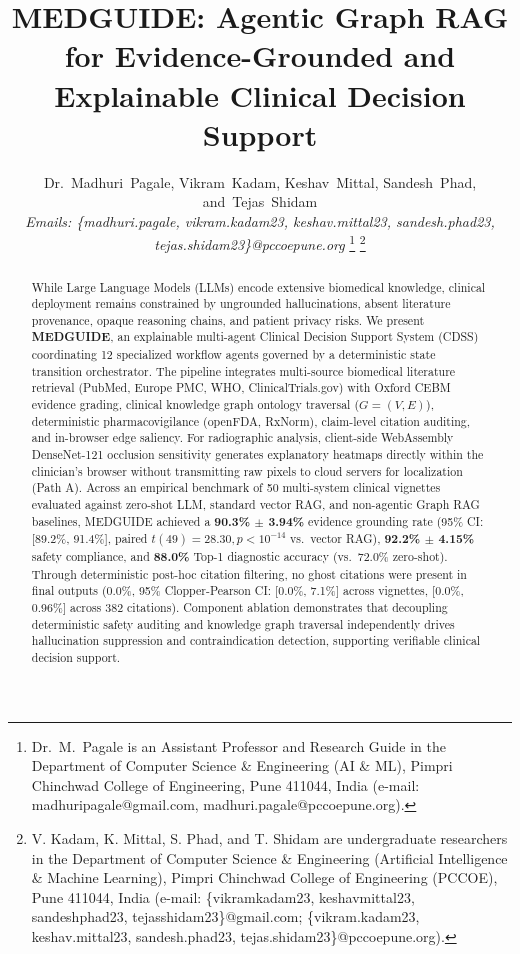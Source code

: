 \documentclass[journal,10pt,twocolumn]{IEEEtran}
\begin{document}
\title{MEDGUIDE: Agentic Graph RAG for Evidence-Grounded and Explainable Clinical Decision Support}

\author{Dr.~Madhuri~Pagale,
        Vikram~Kadam,
        Keshav~Mittal,
        Sandesh~Phad,
        and~Tejas~Shidam\\
        \small\textit{Emails: \{madhuri.pagale, vikram.kadam23, keshav.mittal23, sandesh.phad23, tejas.shidam23\}@pccoepune.org}%
\thanks{Dr.~M.~Pagale is an Assistant Professor and Research Guide in the Department of Computer Science \& Engineering (AI \& ML), Pimpri Chinchwad College of Engineering, Pune 411044, India (e-mail: madhuripagale@gmail.com, madhuri.pagale@pccoepune.org).}%
\thanks{V. Kadam, K. Mittal, S. Phad, and T. Shidam are undergraduate researchers in the Department of Computer Science \& Engineering (Artificial Intelligence \& Machine Learning), Pimpri Chinchwad College of Engineering (PCCOE), Pune 411044, India (e-mail: \{vikramkadam23, keshavmittal23, sandeshphad23, tejasshidam23\}@gmail.com; \{vikram.kadam23, keshav.mittal23, sandesh.phad23, tejas.shidam23\}@pccoepune.org).}%
}

\maketitle

\begin{abstract}
While Large Language Models (LLMs) encode extensive biomedical knowledge, clinical deployment remains constrained by ungrounded hallucinations, absent literature provenance, opaque reasoning chains, and patient privacy risks. We present \textbf{MEDGUIDE}, an explainable multi-agent Clinical Decision Support System (CDSS) coordinating 12 specialized workflow agents governed by a deterministic state transition orchestrator. The pipeline integrates multi-source biomedical literature retrieval (PubMed, Europe PMC, WHO, ClinicalTrials.gov) with Oxford CEBM evidence grading, clinical knowledge graph ontology traversal ($G=(V,E)$), deterministic pharmacovigilance (openFDA, RxNorm), claim-level citation auditing, and in-browser edge saliency. For radiographic analysis, client-side WebAssembly DenseNet-121 occlusion sensitivity generates explanatory heatmaps directly within the clinician's browser without transmitting raw pixels to cloud servers for localization (Path A). Across an empirical benchmark of 50 multi-system clinical vignettes evaluated against zero-shot LLM, standard vector RAG, and non-agentic Graph RAG baselines, MEDGUIDE achieved a \textbf{90.3\% $\pm$ 3.94\%} evidence grounding rate (95\% CI: [89.2\%, 91.4\%], paired $t(49)=28.30, p < 10^{-14}$ vs.\ vector RAG), \textbf{92.2\% $\pm$ 4.15\%} safety compliance, and \textbf{88.0\%} Top-1 diagnostic accuracy (vs.\ 72.0\% zero-shot). Through deterministic post-hoc citation filtering, no ghost citations were present in final outputs (0.0\%, 95\% Clopper-Pearson CI: [0.0\%, 7.1\%] across vignettes, [0.0\%, 0.96\%] across 382 citations). Component ablation demonstrates that decoupling deterministic safety auditing and knowledge graph traversal independently drives hallucination suppression and contraindication detection, supporting verifiable clinical decision support.
\end{abstract}
\end{document}

